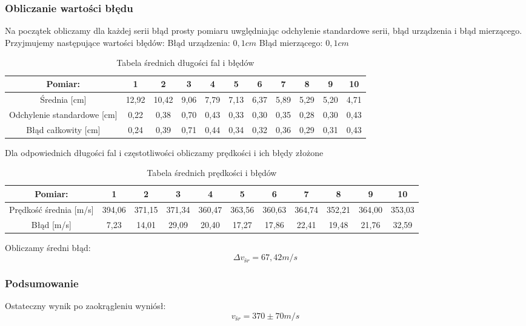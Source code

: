 \documentclass[polish,a4paper]{article}
\begin{document}
\subsubsection{Obliczanie wartości błędu}
Na początek obliczamy dla każdej serii błąd prosty pomiaru uwględniając odchylenie standardowe serii, błąd urządzenia i błąd mierzącego.
\newline
Przyjmujemy następujące wartości błędów:
\newline
Błąd urządzenia: $0,1 cm$
\newline
Błąd mierzącego: $0,1 cm$
\begin{table}[H]
\begin{adjustbox}{center}
\begin{tabular}{|c||c|c|c|c|c|c|c|c|c|c|}
\hline
Pomiar:&1&2&3&4&5&6&7&8&9&10\\
\hline 
Średnia [cm] &	12,92	&	10,42	&	9,06	&	7,79	&	7,13	&	6,37	&	5,89	&	5,29	&	5,20	&	4,71\\
Odchylenie standardowe [cm] &	0,22	&	0,38	&	0,70	&	0,43	&	0,33	&	0,30	&	0,35	&	0,28	&	0,30	&	0,43\\
Błąd całkowity [cm] &	0,24	&	0,39	&	0,71	&	0,44	&	0,34	&	0,32	&	0,36	&	0,29	&	0,31	&	0,43\\
\hline
\end{tabular}
\end{adjustbox}
\caption{Tabela średnich długości fal i błędów}
\end{table}
Dla odpowiednich długości fal i częstotliwości obliczamy prędkości i ich błędy złożone

\begin{table}[H]
\begin{adjustbox}{center}
\begin{tabular}{|c||c|c|c|c|c|c|c|c|c|c|}
\hline
Pomiar:&1&2&3&4&5&6&7&8&9&10\\
\hline 
Prędkość średnia [m/s]&	394,06	&	371,15	&	371,34	&	360,47	&	363,56	&	360,63	&	364,74	&	352,21	&	364,00	&	353,03\\
Błąd [m/s]&	7,23	&	14,01	&	29,09	&	20,40	&	17,27	&	17,86	&	22,41	&	19,48	&	21,76	&	32,59\\
\hline
\end{tabular}
\end{adjustbox}
\caption{Tabela średnich prędkości i błędów}
\end{table}

Obliczamy średni błąd:
$$ \Delta v_{śr} = 67,42 m/s $$


\subsubsection{Podsumowanie}
Ostateczny wynik po zaokrągleniu wyniósł:
$$ v_{śr} = 370 \pm 70  m/s$$
\newpage
\end{document}

